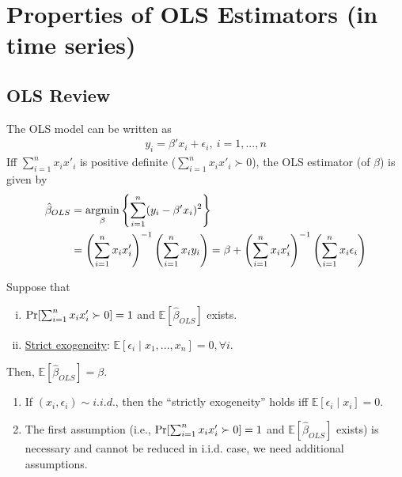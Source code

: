 \documentclass[11pt]{elegantbook}
\newcommand{\argmin}{\operatornamewithlimits{argmin}}
\begin{document}
\section{Properties of OLS Estimators (in time series)}
\subsection{OLS Review}
The OLS model can be written as
\begin{equation}
    \begin{aligned}
        y_i=\beta'x_i+\epsilon_i,\ i=1,...,n
    \end{aligned}
    \nonumber
\end{equation}
Iff $\sum_{i=1}^n x_ix'_i$ is positive definite ($\sum_{i=1}^n x_ix'_i\succ 0$), the OLS estimator (of $\beta$) is given by
\begin{equation}
    \begin{aligned}
        \hat{\beta}_{OLS}&=\argmin_{\beta} \left\{\sum_{i=1}^n (y_i-\beta'x_i)^2\right\}\\
        &=\left(\sum_{i=1}^n x_ix'_i\right)^{-1}\left(\sum_{i=1}^n x_iy_i\right)=\beta+\left(\sum_{i=1}^n x_ix'_i\right)^{-1}\left(\sum_{i=1}^n x_i\epsilon_i\right)
    \end{aligned}
    \nonumber
\end{equation}
\begin{lemma}[Unbiasedness]
    Suppose that
    \begin{enumerate}[(i).]
        \item $\textnormal{Pr}[\sum_{i=1}^n x_ix'_i\succ 0]=1$ and $\mathbb{E}[\hat{\beta}_{OLS}]$ exists.
        \item \underline{Strict exogeneity}: $\mathbb{E}[\epsilon_i\mid x_1,...,x_n]=0,\forall i$.
    \end{enumerate}
    Then, $\mathbb{E}[\hat{\beta}_{OLS}]=\beta$.
\end{lemma}
\begin{remark}
    \begin{enumerate}
        \item If $(x_i,\epsilon_i)\sim i.i.d.$, then the ``strictly exogeneity'' holds iff $\mathbb{E}[\epsilon_i\mid x_i]=0$.
        \item The first assumption (i.e., $\textnormal{Pr}[\sum_{i=1}^n x_ix'_i\succ 0]=1$ and $\mathbb{E}[\hat{\beta}_{OLS}]$ exists) is necessary and cannot be reduced in i.i.d. case, we need additional assumptions.
    \end{enumerate}
\end{remark}
\end{document}
